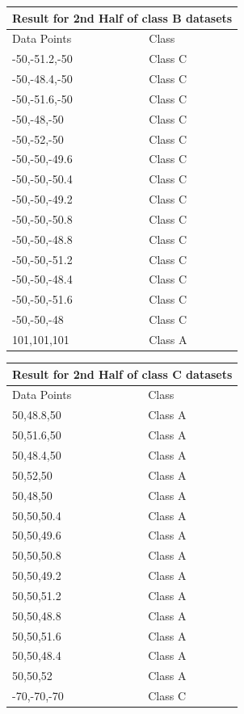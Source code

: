 \documentclass[letterpaper]{article}
\begin{document}
 \begin{tabular}{ |p{5cm}||p{5cm}| }
 \hline
 \multicolumn{2}{|c|}{Result for 2nd Half of class B datasets} \\
 \hline
Data Points& Class\\
 \hline
-50,-51.2,-50 & Class C \\
-50,-48.4,-50 & Class C \\
-50,-51.6,-50 & Class C \\
-50,-48,-50 & Class C \\
-50,-52,-50 & Class C \\
-50,-50,-49.6 & Class C \\
-50,-50,-50.4 & Class C \\
-50,-50,-49.2 & Class C \\
-50,-50,-50.8 & Class C \\
-50,-50,-48.8 & Class C \\
-50,-50,-51.2 & Class C \\
-50,-50,-48.4 & Class C \\
-50,-50,-51.6 & Class C \\
-50,-50,-48 & Class C \\
101,101,101 & Class A \\

 
 \hline
\end{tabular}

\begin{tabular}{ |p{5cm}||p{5cm}| }
 \hline
 \multicolumn{2}{|c|}{Result for 2nd Half of class C datasets} \\
 \hline
Data Points& Class\\
 \hline
50,48.8,50 & Class A \\
50,51.6,50 & Class A \\
50,48.4,50 & Class A \\
50,52,50 & Class A \\
50,48,50 & Class A \\
50,50,50.4 & Class A \\
50,50,49.6 & Class A \\
50,50,50.8 & Class A \\
50,50,49.2 & Class A \\
50,50,51.2 & Class A \\
50,50,48.8 & Class A \\
50,50,51.6 & Class A \\
50,50,48.4 & Class A \\
50,50,52 & Class A \\
-70,-70,-70 & Class C \\ 
 
 \hline
\end{tabular} \\
\end{document}
